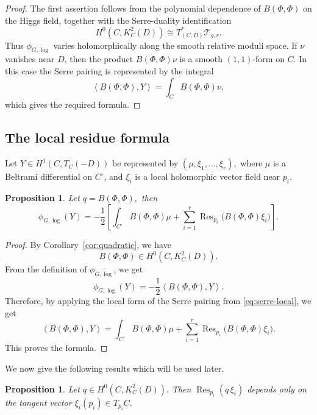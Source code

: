 \documentclass[11pt,reqno]{amsart}
\numberwithin{equation}{section}
\theoremstyle{plain}
\newtheorem{proposition}[theorem]{Proposition}
\theoremstyle{definition}
\theoremstyle{remark}
\begin{document}
\begin{proof}
The first assertion follows from the polynomial dependence of
\(
        B(\Phi,\Phi)
\)
on the Higgs field, together with the Serre-duality identification
\[
        H^0(C,K_C^2(D))
        \cong
        T^*_{(C,D)}\mathcal T_{g,r}.
\]
Thus \(\phi_{G,\log}\) varies holomorphically along the smooth relative moduli
space. If \(\nu\) vanishes near \(D\), then the product \(B(\Phi,\Phi)\nu\) is a smooth
\((1,1)\)-form on \(C\).  In this case the Serre pairing is represented by the integral
\[
        \left\langle B(\Phi,\Phi),Y\right\rangle
        =
        \int_C B(\Phi,\Phi)\nu,
\]
which gives the required formula.
\end{proof}

\subsection{The local residue formula}

Let
\(
        Y\in H^1(C,T_C(-D))
\)
be represented by
\(
        (\mu,\xi_1,\ldots,\xi_r),
\)
where \(\mu\) is a Beltrami differential on \(C^\circ\), and \(\xi_i\) is a
local holomorphic vector field near \(p_i\).

\begin{proposition}
\label{prop:local-serre-formula}
Let
\(
        q=B(\Phi,\Phi),
\)
then
\[
        \phi_{G,\log}(Y)
        =
        -\frac12
        \left[
        \int_{C^\circ} B(\Phi,\Phi)\mu
        +
        \sum_{i=1}^{r}
        \operatorname{Res}_{p_i}
        \bigl(B(\Phi,\Phi)\xi_i\bigr)
        \right].
\]
\end{proposition}

\begin{proof}
By Corollary~\ref{cor:quadratic}, we have
\[
        B(\Phi,\Phi)\in H^0(C,K_C^2(D)).
\]
From the definition of \(\phi_{G,\log}\), we get
\[
        \phi_{G,\log}(Y)
        =
        -\frac12
        \left\langle B(\Phi,\Phi),Y\right\rangle .
\]
Therefore, by applying the local form of the Serre pairing from
\eqref{eq:serre-local}, we get
\[
        \left\langle B(\Phi,\Phi),Y\right\rangle
        =
        \int_{C^\circ} B(\Phi,\Phi)\mu
        +
        \sum_{i=1}^{r}
        \operatorname{Res}_{p_i}
        \bigl(B(\Phi,\Phi)\xi_i\bigr).
\]
This proves the formula.
\end{proof}

We now give the following results which will be used later.

\begin{proposition}
\label{prop:residue-well-defined}
Let
\(
        q\in H^0(C,K_C^2(D)).
\)
Then
\(
        \operatorname{Res}_{p_i}(q\,\xi_i)
\)
depends only on the tangent vector
\(
        \xi_i(p_i)\in T_{p_i}C.
\)
\end{proposition}
\end{document}
